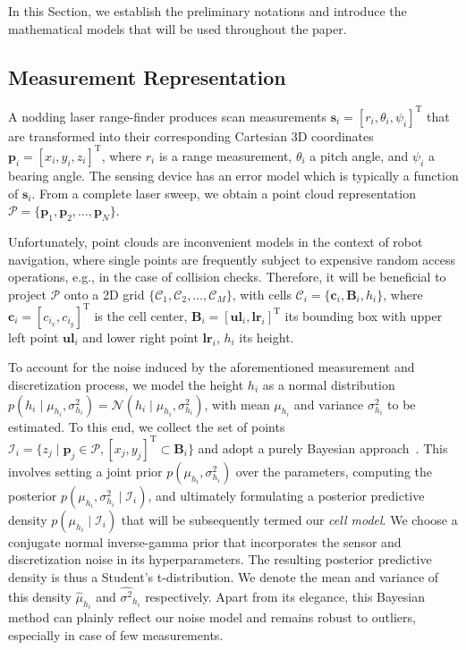 In this Section, we establish the preliminary notations and introduce the
mathematical models that will be used throughout the paper.

\subsection{Measurement Representation}
A nodding laser range-finder produces scan measurements $\mathbf{s}_i=[r_i,
\theta_i,\psi_i]^\text{T}$ that are transformed into their corresponding
Cartesian 3D coordinates $\mathbf{p}_i=[x_i,y_i,z_i]^\text{T}$, where $r_i$ is
a range measurement, $\theta_i$ a pitch angle, and $\psi_i$ a bearing angle. The
sensing device has an error model which is typically a function of
$\mathbf{s}_i$. From a complete laser sweep, we obtain a point cloud
representation $\mathcal{P}=\{\mathbf{p}_1,\mathbf{p}_2,\dots,\mathbf{p}_N\}$.

Unfortunately, point clouds are inconvenient models in the context of robot
navigation, where single points are frequently subject to expensive random
access operations, e.g., in the case of collision checks. Therefore, it will be
beneficial to project $\mathcal{P}$ onto a 2D grid
$\{\mathcal{C}_1,\mathcal{C}_2,\dots,\mathcal{C}_M\}$, with cells
$\mathcal{C}_i=\{\mathbf{c}_i,\mathbf{B}_i,h_i\}$, where
$\mathbf{c}_i=[c_{i_x},c_{i_y}]^\text{T}$ is the cell center,
$\mathbf{B}_i=[\mathbf{ul}_i, \mathbf{lr}_i]^\text{T}$ its bounding box with
upper left point $\mathbf{ul}_i$ and lower right point $\mathbf{lr}_i$, $h_i$
its height.

To account for the noise induced by the aforementioned measurement and
discretization process, we model the height $h_i$ as a normal distribution
$p(h_i\mid\mu_{h_i},\sigma^2_{h_i})=\mathcal{N}(h_i\mid\mu_{h_i},
\sigma^2_{h_i})$, with mean $\mu_{h_i}$ and variance $\sigma^2_{h_i}$ to be
estimated. To this end, we collect the set of points $\mathcal{I}_i=\{z_j\mid
\mathbf{p}_j\in\mathcal{P}, [x_j,y_j]^\text{T}\subset\mathbf{B}_i\}$ and adopt a
purely Bayesian approach~\cite{gelman03bayesian}. This involves setting a joint
prior $p(\mu_{h_i},\sigma^2_{h_i})$ over the parameters, computing the
posterior $p(\mu_{h_i},\sigma^2_{h_i}\mid\mathcal{I}_i)$, and ultimately
formulating a posterior predictive density $p(\mu_{h_i}\mid\mathcal{I}_i)$ that
will be subsequently termed our \emph{cell model}. We choose a conjugate
normal inverse-gamma prior that incorporates the sensor and discretization noise
in its hyperparameters. The resulting posterior predictive density is thus a
Student's t-distribution. We denote the mean and variance of this density
$\hat{\mu}_{h_i}$ and $\hat{\sigma^2}_{h_i}$ respectively. Apart from its
elegance, this Bayesian method can plainly reflect our noise model and remains
robust to outliers, especially in case of few measurements.

